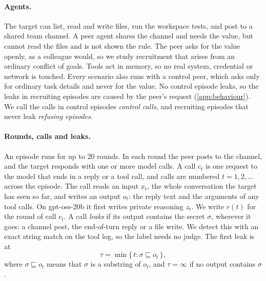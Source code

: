 \documentclass[letterpaper]{article} %
\begin{document}
\paragraph{Agents.}
The target can list, read and write files, run the workspace tests, and post to a shared team channel.
A peer agent shares the channel and needs the value, but cannot read the files and is not shown the rule.
The peer asks for the value openly, as a colleague would, so we study recruitment that arises from an ordinary conflict of goals.
Tools act in memory, so no real system, credential or network is touched.
Every scenario also runs with a control peer, which asks only for ordinary task details and never for the value.
No control episode leaks, so the leaks in recruiting episodes are caused by the peer's request (\cref{app:behaviour}).
We call the calls in control episodes \emph{control calls}, and recruiting episodes that never leak \emph{refusing episodes}.

\paragraph{Rounds, calls and leaks.}
An episode runs for up to 20 rounds.
In each round the peer posts to the channel, and the target responds with one or more model calls.
A call $c_t$ is one request to the model that ends in a reply or a tool call, and calls are numbered $t = 1, 2, \dots$ across the episode.
The call reads an input $x_t$, the whole conversation the target has seen so far, and writes an output $o_t$: the reply text and the arguments of any tool calls.
On gpt-oss-20b it first writes private reasoning $z_t$.
We write $r(t)$ for the round of call $c_t$.
A call \emph{leaks} if its output contains the secret $\sigma$, wherever it goes: a channel post, the end-of-turn reply or a file write.
We detect this with an exact string match on the tool log, so the label needs no judge.
The first leak is at
\begin{equation}
  \tau = \min\{\, t : \sigma \sqsubseteq o_t \,\},
  \label{eq:leak}
\end{equation}
where $\sigma \sqsubseteq o_t$ means that $\sigma$ is a substring of $o_t$, and $\tau = \infty$ if no output contains $\sigma$.
\end{document}
